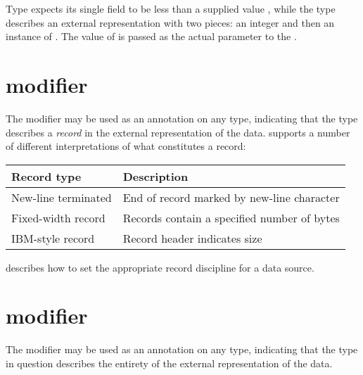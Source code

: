 %
\noindent
Type  expects its single field  to be
less than a supplied value , while the type 
describes an external representation with two pieces: an integer
 and then an instance of .  The value
of  is passed as the actual parameter to the 
\pstruct{}. 

\section{\Precord{} modifier}
\label{sec:common-precord}
The \Precord{} modifier may be used as an annotation on any \pads{}
type, indicating that the type describes a \textit{record} in the
external representation of the data.  \pads{} supports a number of
different interpretations of what constitutes a record:

\begin{center}
\begin{tabular}{l|l}
Record type         & Description\\ \hline
New-line terminated & End of record marked by new-line character\\
Fixed-width record  & Records contain a specified number of bytes\\
IBM-style record    & Record header indicates size\\
\end{tabular}
\end{center}

\noindent
{} describes how
to set the appropriate record discipline for a data source. 


\section{\Psource{} modifier}
\label{sec:common-pfile}
The \Psource{} modifier may be used as an annotation on any \pads{}
type, indicating that the type in question describes the entirety of
the external representation of the data.

